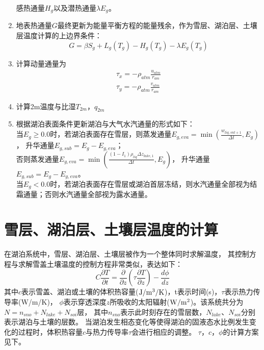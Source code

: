 \begin{enumerate}
    感热通量$H_g$以及潜热通量$\lambda E_g$。
    \item 地表热通量$G$最终更新为能量平衡方程的能量残余，作为雪层、湖泊层、土壤层温度计算的上边界条件：
    \begin{equation}
    G=\beta S_{g}+L_{g}\left(T_{g}\right)-H_{g}\left(T_{g}\right)-\lambda E_{g}\left(T_{g}\right)
    \end{equation}
    \item 计算动量通量为
    \begin{equation}
    \begin{array}{c}\tau_{x}=-\rho_{atm} \frac{u_{atm}}{r_{am}} \\ \tau_{y}=-\rho_{atm} \frac{v_{atm}}{r_{am}}\end{array}
    \end{equation}
    \item 计算2m温度与比湿$T_{2m}$，$q_{2m}$
    \item 根据湖泊表面条件更新湖泊与大气水汽通量的形式如下：\\
    当$E_g\geq0.0$时，若湖泊表面存在雪层，则蒸发通量$E_{g,eva}=\min \left(\frac{w_{liq, s n l+1}}{\Delta t}, E_{g}\right)$，
    升华通量$E_{g,sub}=E_{g}-E_{g,eva}$；\\
    否则蒸发通量$E_{g,eva}=\min \left(\frac{\left(1-I_{1}\right) \rho_{liq} \Delta z_{lake, 1}}{\Delta t}, E_{g}\right)$，
    升华通量$E_{g,sub}=E_{g}-E_{g,eva}$。\\
    当$E_g<0.0$时，若湖泊表面存在雪层或湖泊首层冻结，则水汽通量全部视为结霜通量；否则水汽通量全部视为露水通量。
    
\end{enumerate}

\section{雪层、湖泊层、土壤层温度的计算}\label{雪层湖泊层土壤层温度的计算}
在湖泊系统中，雪层、湖泊层、土壤层被作为一个整体同时求解温度，
其控制方程与求解雪盖土壤温度的控制方程非常类似，表达如下：
\begin{equation}
C \frac{\partial T}{\partial t}=\frac{\partial}{\partial z}\left(\tau \frac{\partial T}{\partial z}\right)-\frac{d \phi}{d z}
\end{equation}
其中$c$表示雪盖、湖泊或土壤的体积热容量($\rm J/m^3/K$)，t表示时间(s)，$\tau$表示热力传导率(W/m/K)，
$\phi$表示穿透深度$z$所吸收的太阳辐射($\rm W/m^2$)。该系统共分为$N=n_{sno}+N_{lake}+N_{soi}$层，
其中$n_{sno}$表示此时刻存在的雪层数，$N_{lake}$、$N_{soi}$分别表示湖泊与土壤的层数。
当湖泊发生相态变化等使得湖泊的固液态水比例发生变化的过程时，体积热容量$c$与热力传导率$\tau$会进行相应的调整。
$\tau$，$c$，$\phi$的计算方案见下。


